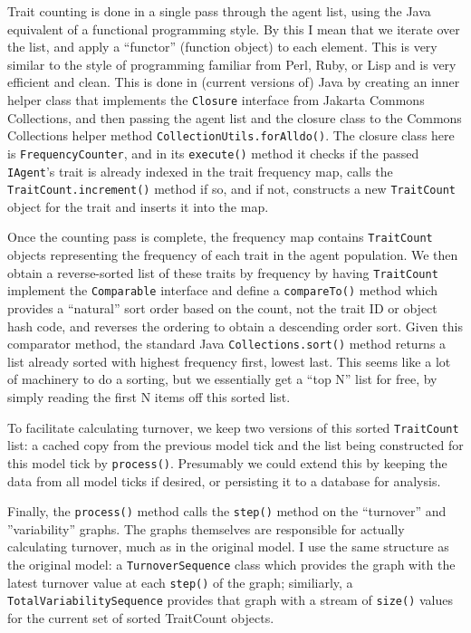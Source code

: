 \documentclass{kluwer-mem-copyright}
\begin{document}
\begin{article}
Trait counting is done in a single pass through the agent list, using the Java
equivalent of a functional programming style.  By this I mean that we iterate
over the list, and apply a ``functor'' (function object) to each element.  This
is very similar to the style of programming familiar from Perl, Ruby, or Lisp
and is very efficient and clean.  This is done in (current versions of) Java by
creating an inner helper class that implements the \texttt{Closure} interface
from Jakarta Commons Collections, and then passing the agent list and the
closure class to the Commons Collections helper method
\texttt{CollectionUtils.forAlldo()}.  The closure class here is
\texttt{FrequencyCounter}, and in its \texttt{execute()} method it checks if the
passed \texttt{IAgent}'s trait is already indexed in the trait frequency map,
calls the \texttt{TraitCount.increment()} method if so, and if not, constructs a
new \texttt{TraitCount} object for the trait and inserts it into the map.

Once the counting pass is complete, the frequency map contains
\texttt{TraitCount} objects representing the frequency of each trait in the
agent population.  We then obtain a reverse-sorted list of these traits by
frequency by having \texttt{TraitCount} implement the \texttt{Comparable}
interface and define a \texttt{compareTo()} method which provides a ``natural''
sort order based on the count, not the trait ID or object hash code, and
reverses the ordering to obtain a descending order sort.  Given this comparator
method, the standard Java \texttt{Collections.sort()} method returns a list
already sorted with highest frequency first, lowest last.  This seems like a lot
of machinery to do a sorting, but we essentially get a ``top N'' list for free,
by simply reading the first N items off this sorted list.

To facilitate calculating turnover, we keep two versions of this sorted
\texttt{TraitCount} list:  a cached copy from the previous model tick and the
list being constructed for this model tick by \texttt{process()}.  Presumably we
could extend this by keeping the data from all model ticks if desired, or
persisting it to a database for analysis.  

Finally, the \texttt{process()} method calls the \texttt{step()} method on the
``turnover'' and ''variability'' graphs. The graphs
themselves are responsible for actually calculating turnover, much as in the original
model.  I use the same structure as the original model:  a
\texttt{TurnoverSequence} class which provides the graph with the latest
turnover value at each \texttt{step()} of the graph; similiarly, a
\texttt{TotalVariabilitySequence} provides that graph with a stream of
\texttt{size()} values for the current set of sorted TraitCount objects.


\end{article}
\end{document}
